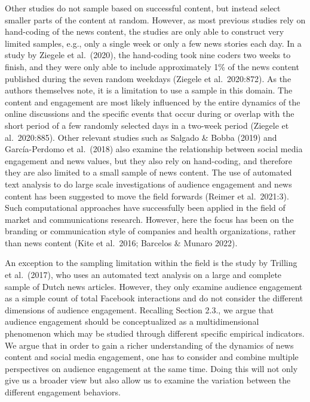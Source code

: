 \documentclass[
]{article}
\begin{document}
Other studies do not sample based on successful content, but instead
select smaller parts of the content at random. However, as most previous
studies rely on hand-coding of the news content, the studies are only
able to construct very limited samples, e.g., only a single week or only
a few news stories each day. In a study by Ziegele et al.~(2020), the
hand-coding took nine coders two weeks to finish, and they were only
able to include approximately 1\% of the news content published during
the seven random weekdays (Ziegele et al.~2020:872). As the authors
themselves note, it is a limitation to use a sample in this domain. The
content and engagement are most likely influenced by the entire dynamics
of the online discussions and the specific events that occur during or
overlap with the short period of a few randomly selected days in a
two-week period (Ziegele et al.~2020:885). Other relevant studies such
as Salgado \& Bobba (2019) and García-Perdomo et al.~(2018) also examine
the relationship between social media engagement and news values, but
they also rely on hand-coding, and therefore they are also limited to a
small sample of news content. The use of automated text analysis to do
large scale investigations of audience engagement and news content has
been suggested to move the field forwards (Reimer et al.~2021:3). Such
computational approaches have successfully been applied in the field of
market and communications research. However, here the focus has been on
the branding or communication style of companies and health
organizations, rather than news content (Kite et al.~2016; Barcelos \&
Munaro 2022).

An exception to the sampling limitation within the field is the study by
Trilling et al.~(2017), who uses an automated text analysis on a large
and complete sample of Dutch news articles. However, they only examine
audience engagement as a simple count of total Facebook interactions and
do not consider the different dimensions of audience engagement.
Recalling Section 2.3., we argue that audience engagement should be
conceptualized as a multidimensional phenomenon which may be studied
through different specific empirical indicators. We argue that in order
to gain a richer understanding of the dynamics of news content and
social media engagement, one has to consider and combine multiple
perspectives on audience engagement at the same time. Doing this will
not only give us a broader view but also allow us to examine the
variation between the different engagement behaviors.
\end{document}
